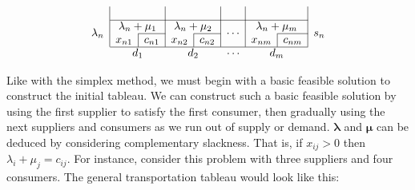 \[\begin{array}{c|c|c|c|c|c|c|c|c|c}
		                               & \multicolumn{2}{c|}{}                            & \multicolumn{2}{c|}{}                            & \multicolumn{2}{c|}{}                            & \multicolumn{2}{c|}{}                            &                                                                              \\\cline{2-9}
		\multirow{2}{*}{\(\lambda_n\)} & \multicolumn{2}{c|}{\lambda_n + \mu_1}           & \multicolumn{2}{c|}{\lambda_n + \mu_2}           & \multicolumn{2}{c|}{\multirow{2}{*}{\(\cdots\)}} & \multicolumn{2}{c|}{\lambda_n + \mu_m}           & \multirow{2}{*}{\(s_n\)}                                                     \\\cline{3-3}\cline{5-5}\cline{9-9}
		                               & \multicolumn{1}{c|}{x_{n1}}                      & c_{n1}                                           & \multicolumn{1}{c|}{x_{n2}}                      & c_{n2}                                           & \multicolumn{2}{c|}{}               & \multicolumn{1}{c|}{x_{nm}} & c_{nm} & \\\cline{2-9}
		\multicolumn{1}{c}{}           & \multicolumn{2}{c}{d_1}                          & \multicolumn{2}{c}{d_2}                          & \multicolumn{2}{c}{\cdots}                       & \multicolumn{2}{c}{d_m}                          & \multicolumn{1}{c}{}
	\end{array}
\]

Like with the simplex method, we must begin with a basic feasible solution to construct the initial tableau.
We can construct such a basic feasible solution by using the first supplier to satisfy the first consumer, then gradually using the next suppliers and consumers as we run out of supply or demand.
\( \bm \lambda \) and \( \bm \mu \) can be deduced by considering complementary slackness.
That is, if \( x_{ij} > 0 \) then \( \lambda_i + \mu_j = c_{ij} \).
For instance, consider this problem with three suppliers and four consumers.
The general transportation tableau would look like this:


